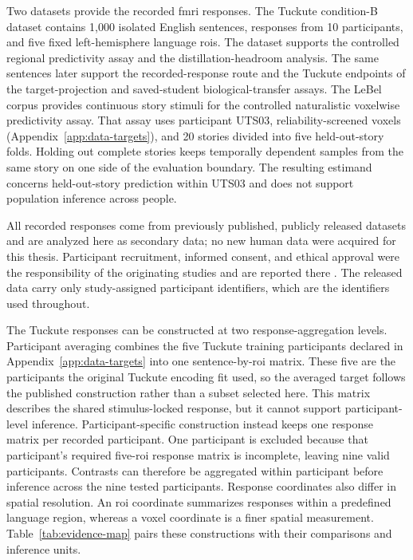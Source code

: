 Two datasets provide the recorded \ac{fmri} responses.
The Tuckute condition-B dataset \autocite{tuckute2024} contains 1,000 isolated English sentences, responses from 10 participants, and five fixed left-hemisphere language \acp{roi}.
The dataset supports the controlled regional predictivity assay and the distillation-headroom analysis.
The same sentences later support the recorded-response route and the Tuckute endpoints of the target-projection and saved-student biological-transfer assays.
The LeBel corpus \autocite{lebel2023} provides continuous story stimuli for the controlled naturalistic voxelwise predictivity assay.
That assay uses participant UTS03, reliability-screened voxels (Appendix~\ref{app:data-targets}), and 20 stories divided into five held-out-story folds.
Holding out complete stories keeps temporally dependent samples from the same story on one side of the evaluation boundary.
The resulting estimand concerns held-out-story prediction within UTS03 and does not support population inference across people.

All recorded responses come from previously published, publicly released datasets and are analyzed here as secondary data; no new human data were acquired for this thesis.
Participant recruitment, informed consent, and ethical approval were the responsibility of the originating studies and are reported there \autocite{tuckute2024,lebel2023}.
The released data carry only study-assigned participant identifiers, which are the identifiers used throughout.

The Tuckute responses can be constructed at two response-aggregation levels.
Participant averaging combines the five Tuckute training participants declared in Appendix~\ref{app:data-targets} into one sentence-by-\ac{roi} matrix.
These five are the participants the original Tuckute encoding fit used, so the averaged target follows the published construction rather than a subset selected here.
This matrix describes the shared stimulus-locked response, but it cannot support participant-level inference.
Participant-specific construction instead keeps one response matrix per recorded participant.
One participant is excluded because that participant's required five-\ac{roi} response matrix is incomplete, leaving nine valid participants.
Contrasts can therefore be aggregated within participant before inference across the nine tested participants.
Response coordinates also differ in spatial resolution.
An \ac{roi} coordinate summarizes responses within a predefined language region, whereas a voxel coordinate is a finer spatial measurement.
Table~\ref{tab:evidence-map} pairs these constructions with their comparisons and inference units.

